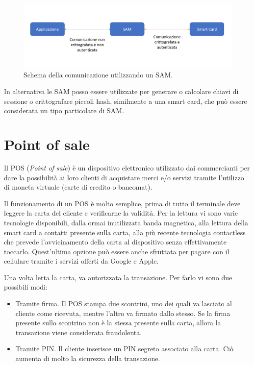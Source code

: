 \begin{figure}[h!]
  \centering
  \includegraphics[width=410pt]{pictures/proxy_sam.png}
  \caption{Schema della comunicazione utilizzando un SAM.}
  \label{fig:proxy_sam}
\end{figure}

In alternativa le SAM posso essere utilizzate per generare o calcolare chiavi di sessione o crittografare piccoli hash, similmente a una smart card, che può essere considerata un tipo particolare di SAM.

\section{Point of sale}
Il POS (\textit{Point of sale}) è un dispositivo elettronico utilizzato dai commercianti per dare la possibilità ai loro clienti di acquistare merci e/o servizi tramite l'utilizzo di moneta virtuale (carte di credito o bancomat).

Il funzionamento di un POS è molto semplice, prima di tutto il terminale deve leggere la carta del cliente e verificarne la validità. Per la lettura vi sono varie tecnologie disponibili, dalla ormai inutilizzata banda magnetica, alla lettura della smart card a contatti presente sulla carta, alla più recente tecnologia contactless che prevede l'avvicinamento della carta al dispositivo senza effettivamente toccarlo. Quest'ultima opzione può essere anche sfruttata per pagare con il cellulare tramite i servizi offerti da Google e Apple.

Una volta letta la carta, va autorizzata la transazione. Per farlo vi sono due possibili modi:
\begin{itemize}
    \item Tramite firma. Il POS stampa due scontrini, uno dei quali va lasciato al cliente come ricevuta, mentre l'altro va firmato dallo stesso. Se la firma presente sullo scontrino non è la stessa presente sulla carta, allora la transazione viene considerata fraudolenta.
    \item Tramite PIN. Il cliente inserisce un PIN segreto associato alla carta. Ciò aumenta di molto la sicurezza della transazione.
\end{itemize}

